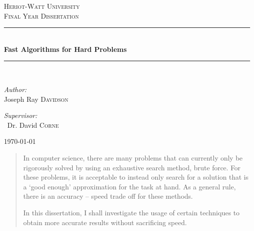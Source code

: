 \documentclass[11pt]{article}
\newcommand{\HRule}{\rule{\linewidth}{0.5mm}}
\theoremstyle{definition}
\begin{document}
  \begin{titlepage}

    \begin{center}


      \textsc{\LARGE Heriot-Watt University}\\[1.5cm]

      \textsc{\Large Final Year Dissertation}\\[0.5cm]


      \HRule \\[0.4cm]
      { \huge \bfseries Fast Algorithms for Hard Problems}\\[0.4cm]

      \HRule \\[1.5cm]

      \begin{minipage}{0.4\textwidth}
        \begin{flushleft} \large
          \emph{Author:}\\
          Joseph Ray \textsc{Davidson}
        \end{flushleft}
      \end{minipage}
      \begin{minipage}{0.4\textwidth}
        \begin{flushright} \large
          \emph{Supervisor:} \\
           ~Dr. David \textsc{Corne} 
        \end{flushright}
      \end{minipage}

      \vfill

      {\large \today}

    \end{center}

  \end{titlepage}

  \begin{abstract}
    In computer science, there are many problems that can currently only be rigorously solved
    by using an exhaustive search method, brute force. For these problems, it is acceptable to
    instead only search for a solution that is a `good enough' approximation for the task at hand.
    As a general rule, there is an accuracy -- speed trade off for these methods. 

    In this dissertation, I shall investigate the usage of certain techniques to obtain more accurate
    results without sacrificing speed.      

  \end{abstract}
  \newpage
\end{document}
